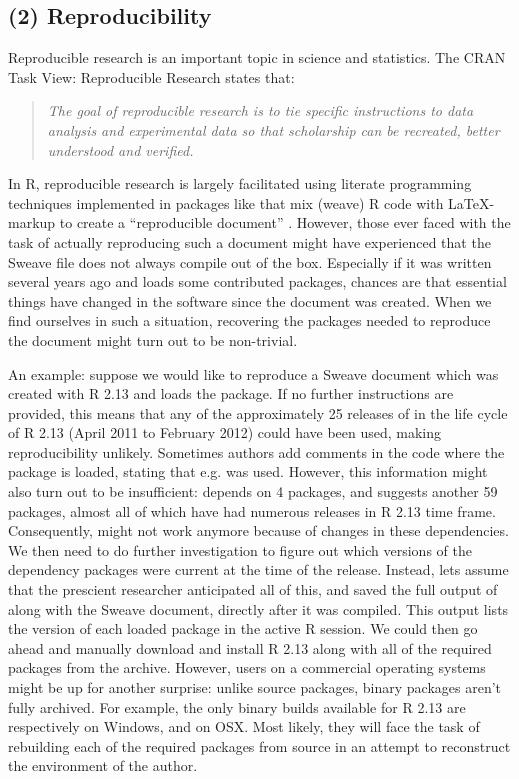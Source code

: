 \subsection{(2) Reproducibility}

Reproducible research is an important topic in science and statistics. The CRAN Task
View: Reproducible Research states that:

\begin{quote}
\emph{The goal of reproducible research is to tie specific instructions
to data analysis and experimental data so that scholarship can be recreated,
better understood and verified.}
\end{quote}
In R, reproducible research is largely facilitated using literate programming
techniques implemented in packages like  that mix (weave) R code
with \LaTeX-markup to create a ``reproducible document''
\citep{leisch2002sweave}. However, those ever faced with the task of actually
reproducing such a document might have experienced that the Sweave file does not
always compile out of the box. Especially if it was written several years ago
and loads some contributed packages, chances are that essential things have
changed in the software since the document was created. When we find ourselves
in such a situation, recovering the packages needed to reproduce the document
might turn out to be non-trivial.

An example: suppose we would like to reproduce a Sweave document which was
created with R 2.13 and loads the  package. If no further
instructions are provided, this means that any of the approximately 25 releases
of  in the life cycle of R 2.13 (April 2011 to February 2012) could
have been used, making reproducibility unlikely. Sometimes authors add comments
in the code where the package is loaded, stating that e.g.  was
used. However, this information might also turn out to be insufficient:
 depends on 4 packages, and suggests another 59 packages, almost all of which
have had numerous releases in R 2.13 time frame.
Consequently,  might not work anymore because of changes in
these dependencies. We then need to do further investigation to figure out
which versions of the dependency packages were current at the time of the
 release. Instead, lets assume that the prescient researcher
anticipated all of this, and saved the full output of 
along with the Sweave document, directly after it was compiled. This output
lists the version of each loaded package in the active R session.
We could then go ahead and manually download and install R 2.13 along with all
of the required packages from the archive. However, users on a commercial
operating systems might be up for another surprise: unlike source packages,
binary packages aren't fully archived. For example, the only binary builds
available for R 2.13 are respectively  on Windows, and
 on OSX. Most likely, they will face the task of rebuilding
each of the required packages from source in an attempt to reconstruct the
environment of the author.

